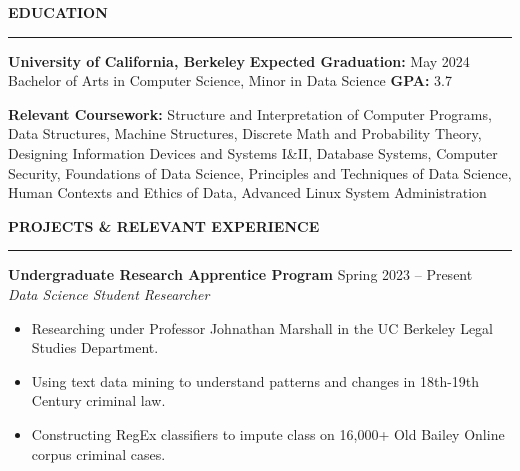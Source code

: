 \documentclass{article}
\begin{document}
    \newcommand{\header}[1]{ 
        \vspace{5mm}
        {\large \noindent \textbf{#1}}
        \vspace{1.5mm}
        \hrule
        \vspace{3.5mm}
    }



    \thispagestyle{empty}

    
    \vspace{1.5mm}

        
    \vspace{-2mm}

    \header{EDUCATION}

        \noindent \textbf{University of California, Berkeley} 
        \hfill 
        \noindent \textbf{Expected Graduation:} May 2024 \\
        Bachelor of Arts in Computer Science, Minor in Data Science \hfill \textbf{GPA:} 3.7

    \vspace{2.5mm}

    \noindent \textbf{Relevant Coursework:}
        Structure and Interpretation of Computer Programs, 
        Data Structures,
        Machine Structures,
        Discrete Math and Probability Theory, 
        Designing Information Devices and Systems I\&II,
        Database Systems,
        Computer Security,
        Foundations of Data Science,
        Principles and Techniques of Data Science, \\
        Human Contexts and Ethics of Data,
        Advanced Linux System Administration
        
    \header{PROJECTS \& RELEVANT EXPERIENCE}

    \noindent \textbf{Undergraduate Research Apprentice Program} \hfill Spring 2023 -- Present
    \\ \textit{Data Science Student Researcher}
    \begin{itemize}
        \item Researching under Professor Johnathan Marshall in the UC Berkeley Legal Studies Department.
        \item Using text data mining to understand patterns and changes in 18th-19th Century criminal law.
        \item Constructing RegEx classifiers to impute class on 16,000+ Old Bailey Online corpus criminal cases.
    \end{itemize}
\end{document}

